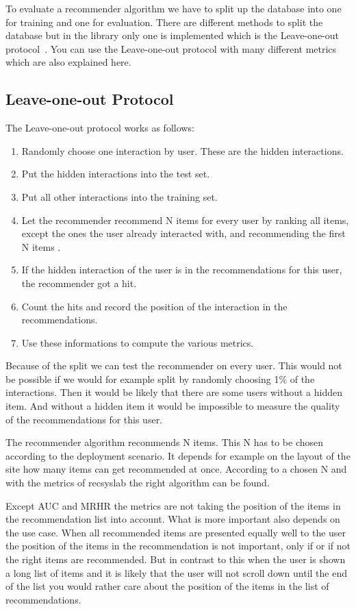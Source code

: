 To evaluate a recommender algorithm we have to split up the database
into one for training and one for evaluation. There are different
methods to split the database but in the library only one is implemented
which is the Leave-one-out protocol~\cite{leaveoneout}.
You can use the Leave-one-out protocol with many different metrics
which are also explained here.


\subsection{Leave-one-out Protocol}
\label{leaveoneout}

The Leave-one-out protocol works as follows:
\begin{enumerate}
\item Randomly choose one interaction by user. These are the hidden
interactions.
\item Put the hidden interactions into the test set.
\item Put all other interactions into the training set.
\item Let the recommender recommend N items for every user by ranking
all items, except the ones the user already interacted with,
and recommending the first N items .
\item If the hidden interaction of the user is in the recommendations
for this user, the recommender got a hit.
\item Count the hits and record the position of the interaction in the 
recommendations.
\item Use these informations to compute the various metrics.

\end{enumerate}
Because of the split we can test the recommender on every user.
This would not be possible
if we would for example split by randomly choosing 1\% of the interactions.
Then it would be likely that there are some users without a hidden item.
And without a hidden item it would be impossible to measure the quality
of the recommendations for this user.

The recommender algorithm recommends N items. This N has to be chosen
according to the deployment scenario. It depends for example 
on the layout of the site how many items can get recommended at
once. According to a chosen N and with the metrics of recsyslab the right
algorithm can be found. 

Except AUC and MRHR the metrics are not taking the position
of the items in the recommendation list into account.
What is more important also depends on the use case.
When all recommended items are presented equally well to the
user the position of the items in the recommendation
is not important, only if or if not the right items are
recommended. But in contrast to this when the user is shown 
a long list of items and it is likely that the user will not
scroll down until the end of the list you would rather care about
the position of the items in the list of recommendations.



